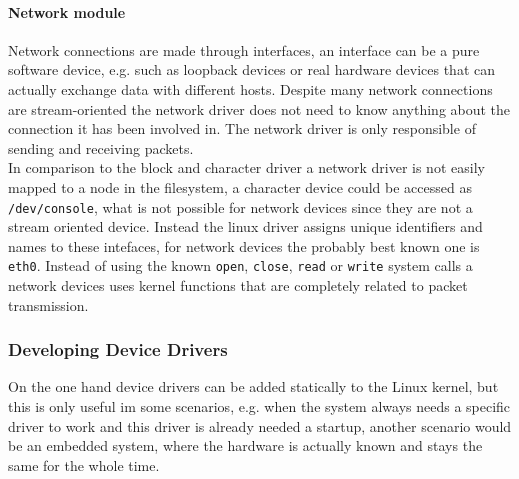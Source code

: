 \documentclass{sig-alternate-05-2015}
\begin{document}
\paragraph{Network module}
Network connections are made through interfaces, an interface can be a pure software device, e.g. such as loopback devices or real hardware devices that can actually exchange data with different hosts. Despite many network connections are stream-oriented the network driver does not need to know anything about the connection it has been involved in. The network driver is only responsible of sending and receiving packets. \\
In comparison to the block and character driver a network driver is not easily mapped to a node in the filesystem, a character device could be accessed as \texttt{/dev/console}, what is not possible for network devices since they are not a stream oriented device. Instead the linux driver assigns unique identifiers and names to these intefaces, for network devices the probably best known one is \texttt{eth0}. Instead of using the known \texttt{open}, \texttt{close}, \texttt{read} or \texttt{write} system calls a network devices uses kernel functions that are completely related to packet transmission. 

\subsubsection{Developing Device Drivers}
On the one hand device drivers can be added statically to the Linux kernel, but this is only useful im some scenarios, e.g. when the system always needs a specific driver to work and this driver is already needed a startup, another scenario would be an embedded system, where the hardware is actually known and stays the same for the whole time. \cite{Corbet:2005:LDD:1209083} \\
\end{document}

